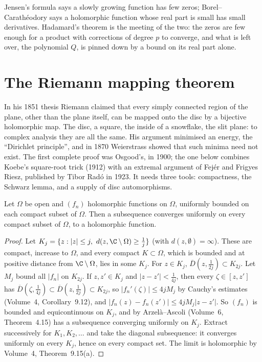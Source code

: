 \begin{beauty}
Jensen's formula says a slowly growing function has few zeros; Borel--Carath\'eodory says a holomorphic function whose real part is small has small derivatives. Hadamard's theorem is the meeting
of the two: the zeros are few enough for a product with corrections of degree $p$ to converge, and what is left over, the polynomial $Q$, is pinned down by a bound on its real part alone.
\end{beauty}

\section{The Riemann mapping theorem}

In his 1851 thesis Riemann claimed that every simply connected region of the plane, other than the plane itself, can be mapped onto the disc by a bijective holomorphic map. The disc, a
square, the inside of a snowflake, the slit plane: to complex analysis they are all the same. His argument minimised an energy, the ``Dirichlet principle'', and in 1870 Weierstrass showed that
such minima need not exist. The first complete proof was Osgood's, in 1900; the one below combines Koebe's square-root trick (1912) with an extremal argument of Fej\'er and Frigyes Riesz, published by
Tibor Rad\'o in 1923. It needs three tools: compactness, the Schwarz lemma, and a supply of disc automorphisms.

\begin{theorem}[Montel, 1907]\label{thm:montel}
Let $\Omega$ be open and $(f_n)$ holomorphic functions on $\Omega$, uniformly bounded on each compact subset of $\Omega$. Then a subsequence converges uniformly on every compact subset of $\Omega$, to a holomorphic
function.
\end{theorem}
\begin{proof}
Let $K_j=\{z:|z|\le j,\ d(z,\C\setminus\Omega)\ge\frac1j\}$ (with $d(z,\emptyset)=\infty$). These are compact, increase to $\Omega$, and every compact $K\subset\Omega$, which is bounded and at positive distance from
$\C\setminus\Omega$, lies in some $K_j$. For $z\in K_j$, $\overline D(z,\frac1{2j})\subset K_{2j}$. Let $M_j$ bound all $|f_n|$ on $K_{2j}$. If $z,z'\in K_j$ and $|z-z'|<\frac1{4j}$, then every $\zeta\in[z,z']$ has
$\overline D(\zeta,\frac1{4j})\subset\overline D(z,\frac1{2j})\subset K_{2j}$, so $|f_n'(\zeta)|\le4jM_j$ by Cauchy's estimates (Volume~4, Corollary~9.12), and $|f_n(z)-f_n(z')|\le4jM_j|z-z'|$. So $(f_n)$ is bounded and
equicontinuous on $K_j$, and by Arzel\`a--Ascoli (Volume~6, Theorem~4.15) has a subsequence converging uniformly on $K_j$. Extract successively for $K_1,K_2,\dots$ and take the diagonal subsequence: it
converges uniformly on every $K_j$, hence on every compact set. The limit is holomorphic by Volume~4, Theorem~9.15(a).
\end{proof}

